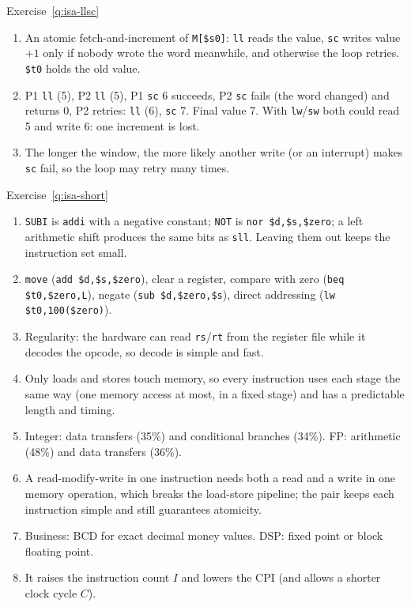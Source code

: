 \begin{noot}{Exercise~\ref{q:isa-llsc}}
\begin{enumerate}[label=(\alph*),leftmargin=*]
  \item An atomic fetch-and-increment of \texttt{M[\$s0]}: \texttt{ll} reads
  the value, \texttt{sc} writes value$+1$ only if nobody wrote the word
  meanwhile, and otherwise the loop retries. \texttt{\$t0} holds the old value.
  \item P1 \texttt{ll} (5), P2 \texttt{ll} (5), P1 \texttt{sc} 6 succeeds, P2
  \texttt{sc} fails (the word changed) and returns 0, P2 retries: \texttt{ll}
  (6), \texttt{sc} 7. Final value 7. With \texttt{lw}/\texttt{sw} both could
  read 5 and write 6: one increment is lost.
  \item The longer the window, the more likely another write (or an interrupt)
  makes \texttt{sc} fail, so the loop may retry many times.
\end{enumerate}
\end{noot}

\begin{noot}{Exercise~\ref{q:isa-short}}
\begin{enumerate}[label=(\alph*),leftmargin=*]
  \item \texttt{SUBI} is \texttt{addi} with a negative constant; \texttt{NOT}
  is \texttt{nor \$d,\$s,\$zero}; a left arithmetic shift produces the same bits
  as \texttt{sll}. Leaving them out keeps the instruction set small.
  \item \texttt{move} (\texttt{add \$d,\$s,\$zero}), clear a register,
  compare with zero (\texttt{beq \$t0,\$zero,L}), negate
  (\texttt{sub \$d,\$zero,\$s}), direct addressing (\texttt{lw \$t0,100(\$zero)}).
  \item Regularity: the hardware can read \texttt{rs}/\texttt{rt} from the
  register file while it decodes the opcode, so decode is simple and fast.
  \item Only loads and stores touch memory, so every instruction uses each
  stage the same way (one memory access at most, in a fixed stage) and has a
  predictable length and timing.
  \item Integer: data transfers (35\%) and conditional branches (34\%).
  FP: arithmetic (48\%) and data transfers (36\%).
  \item A read-modify-write in one instruction needs both a read and a write
  in one memory operation, which breaks the load-store pipeline; the pair keeps
  each instruction simple and still guarantees atomicity.
  \item Business: BCD for exact decimal money values. DSP: fixed point or block
  floating point.
  \item It raises the instruction count $I$ and lowers the CPI (and allows a
  shorter clock cycle $C$).
\end{enumerate}
\end{noot}
